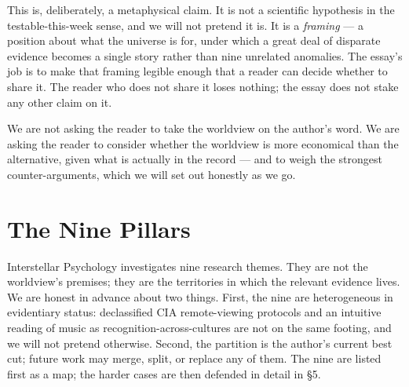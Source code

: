 \documentclass[11pt,a4paper]{article}
\begin{document}
This is, deliberately, a metaphysical claim. It is not a scientific
hypothesis in the testable-this-week sense, and we will not pretend
it is. It is a \emph{framing} --- a position about what the
universe is for, under which a great deal of disparate evidence
becomes a single story rather than nine unrelated anomalies. The
essay's job is to make that framing legible enough that a reader
can decide whether to share it. The reader who does not share it
loses nothing; the essay does not stake any other claim on it.

We are not asking the reader to take the worldview on the author's
word. We are asking the reader to consider whether the worldview is
more economical than the alternative, given what is actually in the
record --- and to weigh the strongest counter-arguments, which we
will set out honestly as we go.

\section{The Nine Pillars}

Interstellar Psychology investigates nine research themes. They are
not the worldview's premises; they are the territories in which the
relevant evidence lives. We are honest in advance about two things.
First, the nine are heterogeneous in evidentiary status: declassified
CIA remote-viewing protocols and an intuitive reading of music as
recognition-across-cultures are not on the same footing, and we will
not pretend otherwise. Second, the partition is the author's current
best cut; future work may merge, split, or replace any of them. The
nine are listed first as a map; the harder cases are then defended
in detail in \S5.
\end{document}
